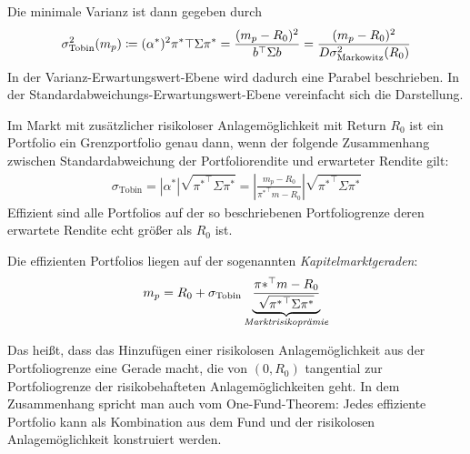 \documentclass[a4paper,twoside,DIV15,BCOR12mm]{scrbook}
\begin{document}
Die minimale Varianz ist dann gegeben durch
\begin{align*}
\sigma_{\text{Tobin}}^2(m_p) \da (\alpha^*)^2 \pi^*\top\Sigma\pi^* = \frac{(m_p-R_0)^2}{b^\top \Sigma b} = \frac {(m_p-R_0)^2}{D\sigma^2_{\text{Markowitz}}(R_0)}
\end{align*}
In der Varianz-Erwartungswert-Ebene wird dadurch eine Parabel beschrieben. In der Stan\-dard\-ab\-weich\-ungs-Erwartungswert-Ebene vereinfacht sich die Darstellung.

\begin{satz}
Im Markt mit zusätzlicher risikoloser Anlagemöglichkeit mit Return $R_0$ ist ein Portfolio ein Grenzportfolio genau dann, wenn der folgende Zusammenhang zwischen Standardabweichung der Portfoliorendite und erwarteter Rendite gilt:
\begin{align*}
\sigma_{\text{Tobin}} = |\alpha^*| \sqrt{ {\pi^*}^\top\Sigma\pi^*} = \left|
\frac{m_p-R_0}{ {\pi^*}^\top m - R_0 }\right| \sqrt{ {\pi^*}^\top\Sigma\pi^*}
\end{align*}
Effizient sind alle Portfolios auf der so beschriebenen Portfoliogrenze deren erwartete Rendite echt größer als $R_0$ ist.
\end{satz}

\begin{definition}
Die effizienten Portfolios liegen auf der sogenannten \emph{Kapitelmarktgeraden}:
\begin{align*}
m_p = R_0 + \sigma_{\text{Tobin}} \underbrace{\frac{ {\pi*}^\top m - R_0}{\sqrt{ {\pi^*}^\top \Sigma \pi^*}}}_{\text{\emph{Marktrisikoprämie}}}
\end{align*}
\end{definition}

Das heißt, dass das Hinzufügen einer risikolosen Anlagemöglichkeit aus der Portfoliogrenze eine Gerade macht, die von $(0,R_0)$ tangential zur Portfoliogrenze der risikobehafteten Anlagemöglichkeiten geht. In dem Zusammenhang spricht man auch vom One-Fund-Theorem: Jedes effiziente Portfolio kann als Kombination aus dem Fund und der risikolosen Anlagemöglichkeit konstruiert werden.
\end{document}
